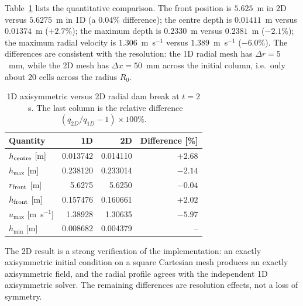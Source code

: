 ﻿\documentclass[11pt,a4paper]{article}
\newcommand{\dx}{\Delta x}
\newcommand{\dr}{\Delta r}
\begin{document}
Table~\ref{tab:radial} lists the quantitative comparison.  The front position
is $5.625$~m in 2D versus $5.6275$~m in 1D (a $0.04\%$ difference); the centre
depth is $0.01411$~m versus $0.01374$~m ($+2.7\%$); the maximum depth is
$0.2330$~m versus $0.2381$~m ($-2.1\%$); the maximum radial velocity is
$1.306$~m~s$^{-1}$ versus $1.389$~m~s$^{-1}$ ($-6.0\%$).  The differences are
consistent with the resolution: the 1D radial mesh has $\dr=5$~mm, while the
2D mesh has $\dx=50$~mm across the initial column, i.e.\ only about 20 cells
across the radius $R_0$.

\begin{table}[H]
\centering
\caption{1D axisymmetric versus 2D radial dam break at $t=2$~s.  The last
column is the relative difference $(q_{2D}/q_{1D}-1)\times100\%$.}
\label{tab:radial}
\small
\begin{tabular}{@{}lrrr@{}}
\toprule
Quantity & 1D & 2D & Difference [\%]\\
\midrule
$h_{\rm centre}$ [m] & 0.013742 & 0.014110 & $+2.68$\\
$h_{\max}$ [m] & 0.238120 & 0.233014 & $-2.14$\\
$r_{\rm front}$ [m] & 5.6275 & 5.6250 & $-0.04$\\
$h_{\rm front}$ [m] & 0.157476 & 0.160661 & $+2.02$\\
$u_{\max}$ [m~s$^{-1}$] & 1.38928 & 1.30635 & $-5.97$\\
$h_{\min}$ [m] & 0.008682 & 0.004379 & --\\
\bottomrule
\end{tabular}
\end{table}

The 2D result is a strong verification of the implementation: an exactly
axisymmetric initial condition on a square Cartesian mesh produces an exactly
axisymmetric field, and the radial profile agrees with the independent 1D
axisymmetric solver.  The remaining differences are resolution effects, not a
loss of symmetry.
\end{document}
